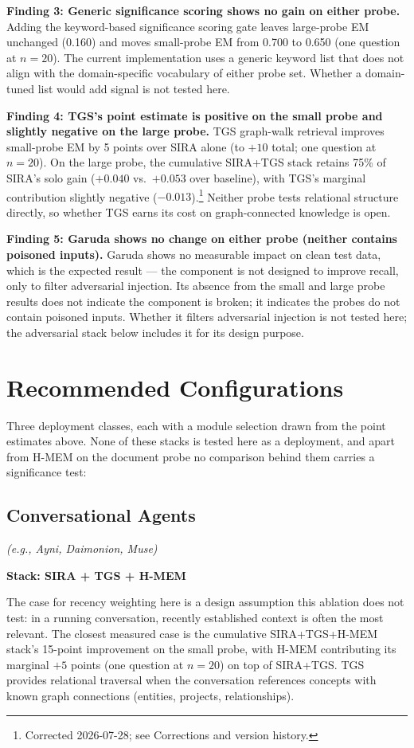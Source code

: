 \documentclass[11pt,a4paper]{article}
\begin{document}
\textbf{Finding 3: Generic significance scoring shows no gain on either probe.}
Adding the keyword-based significance scoring gate leaves large-probe EM unchanged (0.160) and moves small-probe EM from 0.700 to 0.650 (one question at $n=20$). The current implementation uses a generic keyword list that does not align with the domain-specific vocabulary of either probe set. Whether a domain-tuned list would add signal is not tested here.

\textbf{Finding 4: TGS's point estimate is positive on the small probe and slightly negative on the large probe.}
TGS graph-walk retrieval improves small-probe EM by 5 points over SIRA alone (to $+10$ total; one question at $n=20$). On the large probe, the cumulative SIRA+TGS stack retains 75\% of SIRA's solo gain ($+0.040$ vs.\ $+0.053$ over baseline), with TGS's marginal contribution slightly negative ($-0.013$).\footnote{Corrected 2026-07-28; see Corrections and version history.} Neither probe tests relational structure directly, so whether TGS earns its cost on graph-connected knowledge is open.

\textbf{Finding 5: Garuda shows no change on either probe (neither contains poisoned inputs).}
Garuda shows no measurable impact on clean test data, which is the expected result --- the component is not designed to improve recall, only to filter adversarial injection. Its absence from the small and large probe results does not indicate the component is broken; it indicates the probes do not contain poisoned inputs. Whether it filters adversarial injection is not tested here; the adversarial stack below includes it for its design purpose.

\section{Recommended Configurations}

Three deployment classes, each with a module selection drawn from the point estimates above. None of these stacks is tested here as a deployment, and apart from H-MEM on the document probe no comparison behind them carries a significance test:

\subsection{Conversational Agents}
\textit{(e.g., Ayni, Daimonion, Muse)}

\textbf{Stack: SIRA + TGS + H-MEM}

The case for recency weighting here is a design assumption this ablation does not test: in a running conversation, recently established context is often the most relevant. The closest measured case is the cumulative SIRA+TGS+H-MEM stack's 15-point improvement on the small probe, with H-MEM contributing its marginal $+5$ points (one question at $n=20$) on top of SIRA+TGS. TGS provides relational traversal when the conversation references concepts with known graph connections (entities, projects, relationships).
\end{document}
